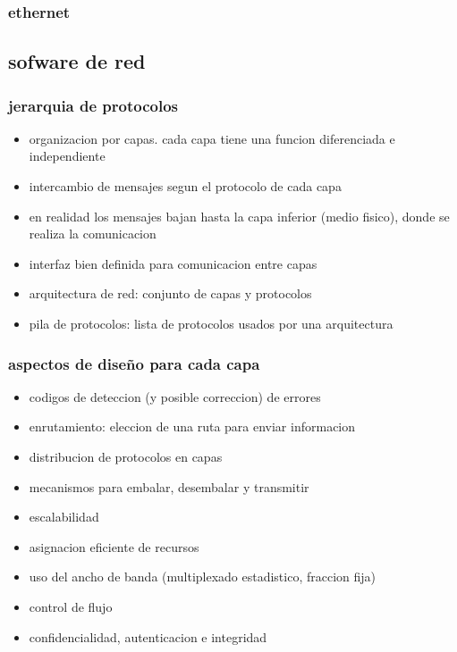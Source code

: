 \documentclass[11pt]{article}
\begin{document}
\subsubsection{ethernet}
\label{sec:org931bf86}
\subsection{sofware de red}
\label{sec:orgadaefd2}
\subsubsection{jerarquia de protocolos}
\label{sec:org27aa5b3}
\begin{itemize}
\item organizacion por capas. cada capa tiene una funcion diferenciada e independiente
\item intercambio de mensajes segun el protocolo de cada capa
\item en realidad los mensajes bajan hasta la capa inferior (medio fisico), donde se realiza la comunicacion
\item interfaz bien definida para comunicacion entre capas
\item arquitectura de red: conjunto de capas y protocolos
\item pila de protocolos: lista de protocolos usados por una arquitectura
\end{itemize}
\subsubsection{aspectos de diseño para cada capa}
\label{sec:org3f984c5}
\begin{itemize}
\item codigos de deteccion (y posible correccion) de errores
\item enrutamiento: eleccion de una ruta para enviar informacion
\item distribucion de protocolos en capas
\item mecanismos para embalar, desembalar y transmitir
\item escalabilidad
\item asignacion eficiente de recursos
\item uso del ancho de banda (multiplexado estadistico, fraccion fija)
\item control de flujo
\item confidencialidad, autenticacion e integridad
\end{itemize}
\end{document}
